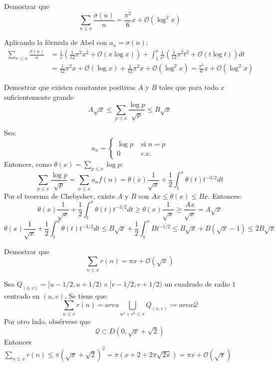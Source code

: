 \documentclass[twoside]{article}
\begin{document}
\begin{ejercicio}{8}
Demostrar que
\[ \sum_{n≤x} \frac{σ(n)}{n} = \frac{π^2}{6} x + \mathcal{O}(\log^2 x) \]
\end{ejercicio}
\begin{sol}
Aplicando la fórmula de Abel con $a_n = σ(n)$:
\begin{align*}
	\sum_{n≤x} \frac{σ(n)}{n} & = \frac{1}{x}\left(\frac{1}{12}π^2x^2 + \mathcal{O}(x \log x)\right) + \int_1^x \frac{1}{t^2}\left(\frac{1}{12}π^2t^2 + \mathcal{O}(t \log t)\right)dt\\
	& = \frac{1}{12}π^2x + \mathcal{O}(\log x) + \frac{1}{12}π^2x + \mathcal{O}(\log^2 x) = \frac{π^2}{6}x + \mathcal{O}(\log^2 x)
\end{align*}
\end{sol}

\newpage

\begin{ejercicio}{9}
Demostrar que existen constantes positivas $A$ y $B$ tales que para todo $x$ suficientemente grande
\[ A\sqrt{x} ≤ \sum_{p≤x} \frac{\log p}{\sqrt{p}} ≤ B \sqrt{x}\]
\end{ejercicio}
\begin{sol}
Sea:
\[ a_n = \begin{cases}
	\log p &\text{ si }n = p\\
	0 & \text{ c.c.}
\end{cases}\]
Entonces, como $θ(x) = \sum_{p≤x} \log p$:
\[ \sum_{p≤x} \frac{\log p}{\sqrt{p}}  = \sum_{n≤x} a_n f(n) = θ(x) \frac{1}{\sqrt{x}} + \frac{1}{2} \int_1^x θ(t) t^{-3/2} dt \]
Por el teorema de Chebyshev, existe $A$ y $B$ con $Ax ≤ θ(x) ≤ Bx$. Entonces:
\[ θ(x) \frac{1}{\sqrt{x}} + \frac{1}{2} \int_1^x θ(t) t^{-3/2} dt ≥ θ(x) \frac{1}{\sqrt{x}} ≥ \frac{Ax}{\sqrt{x}} = A\sqrt{x}\]
\[ θ(x) \frac{1}{\sqrt{x}} + \frac{1}{2} \int_1^x θ(t) t^{-3/2} dt ≤ B\sqrt{x} + \frac{1}{2} \int_1^x Bt^{-1/2} ≤ B\sqrt{x}+B(\sqrt{x}-1) ≤ 2B \sqrt{x} \]
\end{sol}

\newpage

\begin{ejercicio}{10}
Demostrar que
\[ \sum_{n≤x} r(n) = πx + \mathcal{O}(\sqrt{x}) \]
\end{ejercicio}
\begin{solucion}
Sea $Q_{(u,v)}=[u-1/2,u+1/2)\times[v-1/2,v+1/2)$ un cuadrado de radio $1$ centrado en $(u,v)$. Se tiene que:
\[ \sum_{n≤x} r(n) = area \bigcup_{u^2+v^2≤x} Q_{(u,v)} := area \mathcal{Q} \]
Por otro lado, obsérvese que
\[ \mathcal{Q} \subset D(0,\sqrt{x}+\sqrt{2}) \]
Entonces $\sum_{n≤x} r(n) ≤ π(\sqrt{x}+\sqrt{2})^2 = π(x+2+2π\sqrt{2x}) = πx + \mathcal{O}(\sqrt{x})$
\end{solucion}
\end{document}
